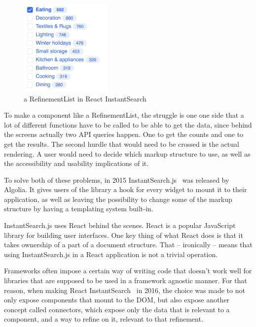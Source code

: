 \begin{figure}[H]
\label{figure:refinementlist-ris}
  \centering
  \includegraphics[width=0.4\textwidth]{../assets/refinementlist.png}
  \caption{a RefinementList in React InstantSearch\cite{ris-storybooks}}
\end{figure}

To make a component like a RefinementList, the struggle is one one side that a lot of different functions have to be called to be able to get the data, since behind the screens actually two API queries happen. One to get the counts and one to get the results. The second hurdle that would need to be crossed is the actual rendering. A user would need to decide which markup structure to use, as well as the accessibility and usability implications of it.

To solve both of these problems, in 2015 InstantSearch.js~\cite{instantsearch-js} was released by Algolia. It gives users of the library a hook for every widget to mount it to their application, as well as leaving the possibility to change some of the markup structure by having a templating system built-in.

InstantSearch.js uses React behind the scenes. React\cite{react-doc} is a popular JavaScript library for building user interfaces. One key thing of what React does is that it takes ownership of a part of a document structure. That -- ironically -- means that using InstantSearch.js in a React application is not a trivial operation.

Frameworks often impose a certain way of writing code that doesn't work well for libraries that are supposed to be used in a framework agnostic manner. For that reason, when making React InstantSearch~\cite{react-instantsearch} in 2016, the choice was made to not only expose components that mount to the DOM, but also expose another concept called connectors, which expose only the data that is relevant to a component, and a way to refine on it, relevant to that refinement.

